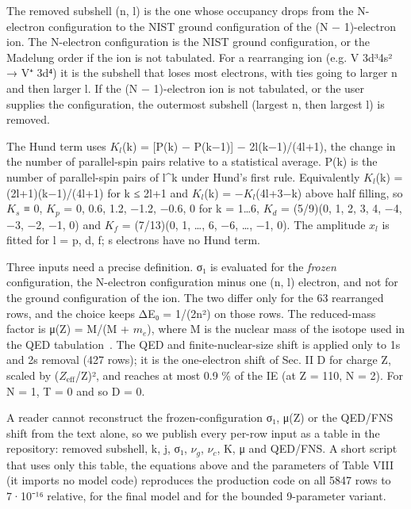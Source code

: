 \documentclass[aps,pra,preprint,notitlepage,superscriptaddress,amsmath,amssymb]{revtex4-2}
\begin{document}
The removed subshell (n, l) is the one whose occupancy drops from the N-electron configuration to the NIST ground configuration of the (N − 1)-electron ion. The N-electron configuration is the NIST ground configuration, or the Madelung order if the ion is not tabulated. For a rearranging ion (e.g. V 3d³4s² → V⁺ 3d⁴) it is the subshell that loses most electrons, with ties going to larger n and then larger l. If the (N − 1)-electron ion is not tabulated, or the user supplies the configuration, the outermost subshell (largest n, then largest l) is removed.


The Hund term uses $K_{l}$(k) = [P(k) − P(k−1)] − 2l(k−1)/(4l+1), the change in the number of parallel-spin pairs relative to a statistical average. P(k) is the number of parallel-spin pairs of l\textasciicircum{}k under Hund's first rule. Equivalently $K_{l}$(k) = (2l+1)(k−1)/(4l+1) for k ≤ 2l+1 and $K_{l}$(k) = −$K_{l}$(4l+3−k) above half filling, so $K_{s}$ ≡ 0, $K_{p}$ = 0, 0.6, 1.2, −1.2, −0.6, 0 for k = 1…6, $K_{d}$ = (5/9)(0, 1, 2, 3, 4, −4, −3, −2, −1, 0) and $K_{f}$ = (7/13)(0, 1, …, 6, −6, …, −1, 0). The amplitude $x_{l}$ is fitted for l = p, d, f; s electrons have no Hund term.


Three inputs need a precise definition. σ₁ is evaluated for the \emph{frozen} configuration, the N-electron configuration minus one (n, l) electron, and not for the ground configuration of the ion. The two differ only for the 63 rearranged rows, and the choice keeps ΔE₀ = 1/(2n²) on those rows. The reduced-mass factor is μ(Z) = M/(M + $m_{e}$), where M is the nuclear mass of the isotope used in the QED tabulation~\cite{r30}. The QED and finite-nuclear-size shift is applied only to 1s and 2s removal (427 rows); it is the one-electron shift of Sec. II D for charge Z, scaled by ($Z_{\mathrm{eff}}$/Z)², and reaches at most 0.9 \% of the IE (at Z = 110, N = 2). For N = 1, T = 0 and so D = 0.


A reader cannot reconstruct the frozen-configuration σ₁, μ(Z) or the QED/FNS shift from the text alone, so we publish every per-row input as a table in the repository: removed subshell, k, j, σ₁, $ν_{g}$, $ν_{c}$, K, μ and QED/FNS. A short script that uses only this table, the equations above and the parameters of Table VIII (it imports no model code) reproduces the production code on all 5847 rows to 7·10⁻¹⁶ relative, for the final model and for the bounded 9-parameter variant.
\end{document}
